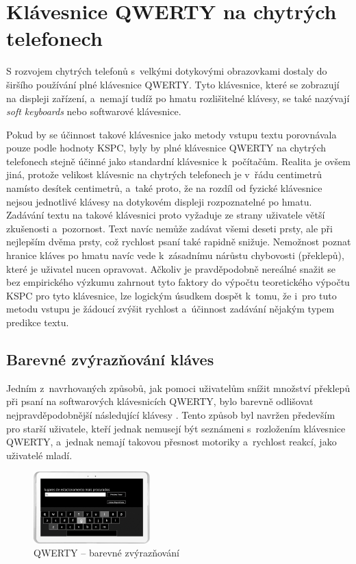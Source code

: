 \documentclass[a4paper,11pt,openany]{book} %
\begin{document}
\section{Klávesnice QWERTY na chytrých telefonech}

S rozvojem chytrých telefonů s~velkými dotykovými obrazovkami dostaly do širšího používání plné klávesnice QWERTY. Tyto klávesnice, které se zobrazují na displeji zařízení, a~nemají tudíž po hmatu rozlišitelné klávesy, se také nazývají {\it soft keyboards} nebo softwarové klávesnice.

Pokud by se účinnost takové klávesnice jako metody vstupu textu porovnávala pouze podle hodnoty KSPC, byly by plné klávesnice QWERTY na chytrých telefonech stejně účinné jako standardní klávesnice k~počítačům. Realita je ovšem jiná, protože velikost klávesnic na chytrých telefonech je v~řádu centimetrů namísto desítek centimetrů, a~také proto, že na rozdíl od fyzické klávesnice nejsou jednotlivé klávesy na dotykovém displeji rozpoznatelné po hmatu. Zadávání textu na takové klávesnici proto vyžaduje ze strany uživatele větší zkušenosti a~pozornost. Text navíc nemůže zadávat všemi deseti prsty, ale při nejlepším dvěma prsty, což rychlost psaní také rapidně snižuje. Nemožnost poznat hranice kláves po hmatu navíc vede k~zásadnímu nárůstu chybovosti (překlepů), které je uživatel nucen opravovat. Ačkoliv je pravděpodobně nereálné snažit se bez empirického výzkumu zahrnout tyto faktory do výpočtu teoretického výpočtu KSPC pro tyto klávesnice, lze logickým úsudkem dospět k~tomu, že i~pro tuto metodu vstupu je žádoucí zvýšit rychlost a~účinnost zadávání nějakým typem predikce textu.

\subsection{Barevné zvýrazňování kláves}

Jedním z~navrhovaných způsobů, jak pomoci uživatelům snížit množství překlepů při psaní na softwarových klávesnicích QWERTY, bylo barevně odlišovat nejpravděpodobnější následující klávesy \parencite{danielgoncalves}. %
Tento způsob byl navržen především pro starší uživatele, kteří jednak nemusejí být seznámeni s~rozložením klávesnice QWERTY, a~jednak nemají takovou přesnost motoriky a~rychlost reakcí, jako uživatelé mladí. 

\begin{figure}[ht]
	\centering
	\includegraphics[width=0.4\textwidth]{qwerty_color}
	\caption{QWERTY -- barevné zvýrazňování}
	\label{fig:qwerty-color}
\end{figure}
\end{document}
